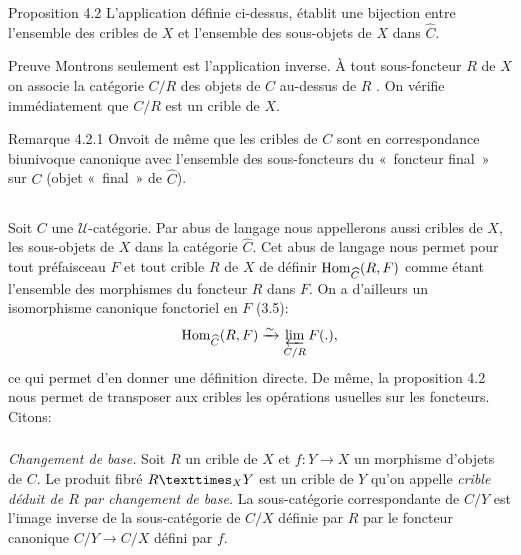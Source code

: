 \documentclass[10pt]{../fichiers-configuration-latex/smfart}
\begin{document}
\begin{enonce*}{Proposition 4.2}
L'application définie ci-dessus, établit une %
bijection entre l'ensemble des cribles de $X$ et l'ensemble des
sous-objets de $X$ dans $\widehat{C}$.
\end{enonce*}

\begin{enonce*}[remark]{Preuve}
Montrons seulement  est l'application inverse. À tout
sous-foncteur $R$ de $X$ on associe la catégorie $C/R$ des objets de
$C$ au-dessus de $R$ . On vérifie
immédiatement que $C/R$ est un crible de $X$.
\end{enonce*}

\begin{enonce*}[remark]{Remarque 4.2.1}
On\pageoriginale voit de même que les cribles de $C$ sont en
correspondance biunivoque canonique avec l'ensemble des
sous-foncteurs du « foncteur final » sur $C$ (objet « final » de $\widehat{C}$).
\end{enonce*}

\setcounter{subsection}{2}
\subsection{}
Soit $C$ une $𝒰$-catégorie. Par abus de langage nous
appellerons aussi cribles de $X$, les sous-objets de $X$ dans la
catégorie $\widehat{C}$. Cet abus de langage nous
permet pour tout préfaisceau $F$ et tout crible $R$ de $X$ de
définir $\operatorname{Hom}_{\widehat{C}}(R,F)$ comme étant
l'ensemble des %
morphismes du foncteur $R$ dans $F$. On a d'ailleurs un isomorphisme
canonique fonctoriel en $F$ (3.5):
$$
\operatorname{Hom}_{\widehat{C}}(R,F)\xrightarrow{\sim}\varprojlim_{C/R}
F(.){},
$$
ce qui permet d'en donner une définition directe. De même, la proposition 4.2 nous permet de transposer aux
cribles les opérations usuelles sur les foncteurs. Citons:

\subsubsection{}
\emph{Changement de base.} Soit $R$ un crible de $X$ et
$f:Y\rightarrow X$ un morphisme d'objets de $C$. Le produit fibré
$\fprod{R}{Y}{X}$ est un crible de $Y$ qu'on appelle \emph{crible
déduit
  de $R$ par changement de base.} La sous-catégorie correspondante
de $C/Y$ est l'image inverse de la sous-catégorie de $C/X$ définie
par $R$ par le foncteur canonique $C/Y\rightarrow C/X$ défini par
$f$.
\end{document}

